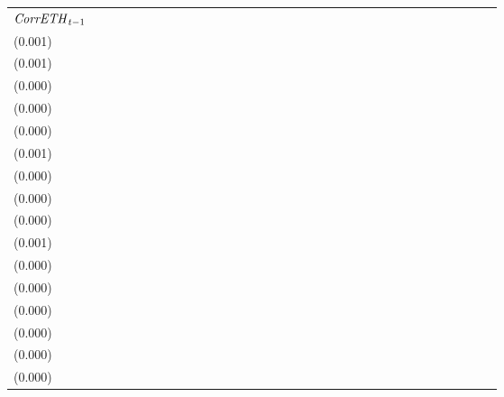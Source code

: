 \begin{tabular}{lllllllllllllllllllllllllllllllll}
${{\it CorrETH}}_{t-1}$      &  \makecell{$-0.005^{**}$ \\(0.001)} &                                     &  \makecell{$-0.019^{**}$ \\(0.001)} &                                     &     \makecell{$0.000^{}$ \\(0.000)} &                                     &  \makecell{$-0.002^{**}$ \\(0.000)} &                                     &  \makecell{$-0.003^{**}$ \\(0.000)} &                                     &   \makecell{$0.003^{**}$ \\(0.001)} &                                     &    \makecell{$-0.000^{}$ \\(0.000)} &                                     &     \makecell{$0.000^{}$ \\(0.000)} &                                     &  \makecell{$-0.002^{**}$ \\(0.000)} &                                     &    \makecell{$0.001^{*}$ \\(0.001)} &                                     &    \makecell{$-0.000^{}$ \\(0.000)} &                                     &     \makecell{$0.000^{}$ \\(0.000)} &                                     &  \makecell{$-0.002^{**}$ \\(0.000)} &                                     &  \makecell{$-0.004^{**}$ \\(0.000)} &                                    &    \makecell{$0.000^{}$ \\(0.000)} &                                    &   \makecell{$-0.000^{}$ \\(0.000)} &                                    \\

\end{tabular}
